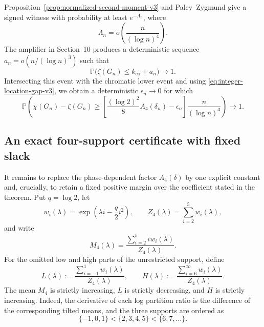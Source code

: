 Proposition~\ref{prop:normalized-second-moment-v3} and Paley--Zygmund give a
signed witness with probability at least $e^{-\Lambda_n}$, where
\[
  \Lambda_n=o\!\left(\frac{n}{(\log n)^4}\right).
\]
The amplifier in Section~10 produces a deterministic sequence
$a_n=o(n/(\log n)^3)$ such that
\[
  \mathbb P\bigl(\zeta(G_n)\le k_{\mathrm{co}}+a_n\bigr)
  \longrightarrow1.
\]
Intersecting this event with the chromatic lower event and using
\eqref{eq:integer-location-gap-v3}, we obtain a deterministic
$\epsilon_n\to0$ for which
\begin{equation}
  \mathbb P\!\left(
    \chi(G_n)-\zeta(G_n)
    \ge
    \left[
      \frac{(\log 2)^2}{8}A_4(\delta_n)-\epsilon_n
    \right]
    \frac{n}{(\log n)^3}
  \right)
  \longrightarrow1.
  \label{eq:phase-resolved-final-v3}
\end{equation}

\subsection{An exact four-support certificate with fixed slack}

It remains to replace the phase-dependent factor $A_4(\delta)$ by one explicit
constant and, crucially, to retain a fixed positive margin over the coefficient
stated in the theorem. Put $q=\log 2$, let
\[
  w_i(\lambda)=\exp\!\left(\lambda i-\frac q2i^2\right),
  \qquad
  Z_4(\lambda)=\sum_{i=2}^{5}w_i(\lambda),
\]
and write
\[
  M_4(\lambda)
  =
  \frac{\sum_{i=2}^{5}i w_i(\lambda)}{Z_4(\lambda)}.
\]
For the omitted low and high parts of the unrestricted support, define
\[
  L(\lambda)
  :=
  \frac{\sum_{i=-1}^{1}w_i(\lambda)}{Z_4(\lambda)},
  \qquad
  H(\lambda)
  :=
  \frac{\sum_{i=6}^{\infty}w_i(\lambda)}{Z_4(\lambda)}.
\]
The mean $M_4$ is strictly increasing, $L$ is strictly decreasing, and $H$ is
strictly increasing. Indeed, the derivative of each log partition ratio is the
difference of the corresponding tilted means, and the three supports are
ordered as
\[
  \{-1,0,1\}<\{2,3,4,5\}<\{6,7,\ldots\}.
\]

